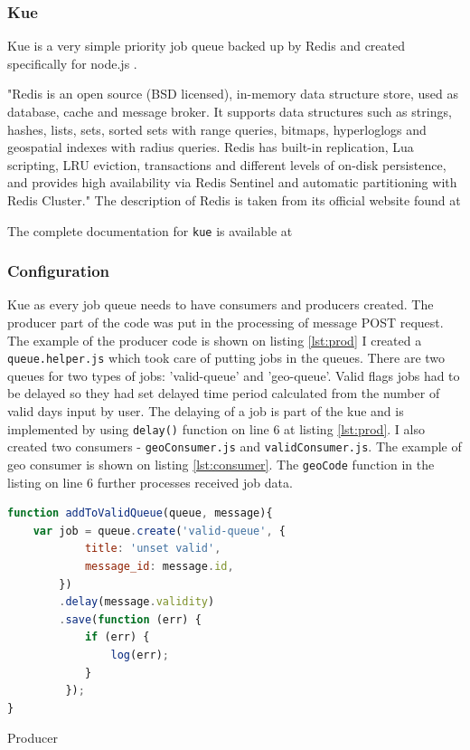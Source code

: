\documentclass[thesis=M,english]{FITthesis}[2012/10/20]
\begin{document}
\subsubsection{Kue}

Kue is a very simple priority job queue backed up by Redis and created specifically for node.js .

"Redis is an open source (BSD licensed), in-memory data structure store, used as database, cache and message broker. It supports data structures such as strings, hashes, lists, sets, sorted sets with range queries, bitmaps, hyperloglogs and geospatial indexes with radius queries. Redis has built-in replication, Lua scripting, LRU eviction, transactions and different levels of on-disk persistence, and provides high availability via Redis Sentinel and automatic partitioning with Redis Cluster." The description of Redis is taken from its official website found at \cite{redis}

The complete documentation for \verb|kue| is available at \cite{kue}

\subsubsection{Configuration}

Kue as every job queue needs to have consumers and producers created. The producer part of the code was put in the processing of message POST request. The example of the producer code is shown on listing \ref{lst:prod} I created a \verb|queue.helper.js| which took care of putting jobs in the queues. There are two queues for two types of jobs: 'valid-queue' and 'geo-queue'. Valid flags jobs had to be delayed so they had set delayed time period calculated from the number of valid days input by user. The delaying of a job is part of the kue and is implemented by using \verb|delay()| function on line 6 at listing \ref{lst:prod}. I also created two consumers - \verb|geoConsumer.js| and \verb|validConsumer.js|. The example of geo consumer is shown on listing \ref{lst:consumer}. The \verb|geoCode| function in the listing on line 6 further processes received job data.


\begin{listing}
\begin{lstlisting}[language=JavaScript]
function addToValidQueue(queue, message){
    var job = queue.create('valid-queue', {
            title: 'unset valid',
            message_id: message.id,
        })
        .delay(message.validity)
        .save(function (err) {
            if (err) {
            	log(err);
            }
         });
}
\end{lstlisting}
\caption{Producer}
\label{lst:prod}
\end{listing}
\end{document}
